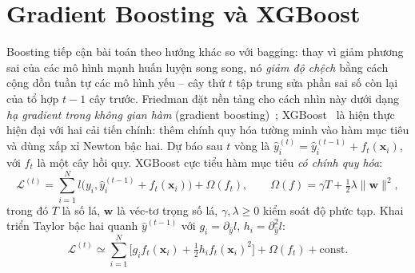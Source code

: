 \documentclass[12pt,a4paper,oneside]{report}
\theoremstyle{vnplain}
\theoremstyle{vndef}
\newcommand{\xv}{\mathbf{x}}
\begin{document}
\section{Gradient Boosting và XGBoost}\label{sec:xgb}
Boosting tiếp cận bài toán theo hướng khác so với bagging: thay vì giảm phương sai của các mô hình mạnh
huấn luyện song song, nó \emph{giảm độ chệch} bằng cách cộng dồn tuần tự các mô hình yếu
-- cây thứ $t$ tập trung sửa phần sai số còn lại của tổ hợp $t-1$ cây trước. Friedman đặt
nền tảng cho cách nhìn này dưới dạng \emph{hạ gradient trong không gian hàm}
(gradient boosting)~\cite{friedman2001}; XGBoost~\cite{chen2016} là hiện thực hiện đại
với hai cải tiến chính: thêm chính quy hóa tường minh vào hàm mục tiêu và dùng xấp xỉ
Newton bậc hai. Dự báo sau $t$ vòng là
$\hat y_i^{(t)}=\hat y_i^{(t-1)}+f_t(\xv_i)$, với $f_t$ là một cây hồi quy. XGBoost cực
tiểu hàm mục tiêu \emph{có chính quy hóa}:
\begin{equation}
  \mathcal{L}^{(t)}=\sum_{i=1}^{N} l\!\big(y_i,\hat y_i^{(t-1)}+f_t(\xv_i)\big)
  +\Omega(f_t),
  \qquad
  \Omega(f)=\gamma T+\tfrac12\lambda\lVert\mathbf{w}\rVert^2,
  \label{eq:xgbobj}
\end{equation}
trong đó $T$ là số lá, $\mathbf{w}$ là véc-tơ trọng số lá, $\gamma,\lambda\ge 0$ kiểm soát
độ phức tạp. Khai triển Taylor bậc hai quanh $\hat y^{(t-1)}$ với
$g_i=\partial_{\hat y}l$, $h_i=\partial^2_{\hat y}l$:
\begin{equation}
  \mathcal{L}^{(t)}\simeq\sum_{i=1}^{N}\Big[g_i f_t(\xv_i)+\tfrac12 h_i f_t(\xv_i)^2\Big]
  +\Omega(f_t)+\text{const}.
  \label{eq:taylor}
\end{equation}
\end{document}
